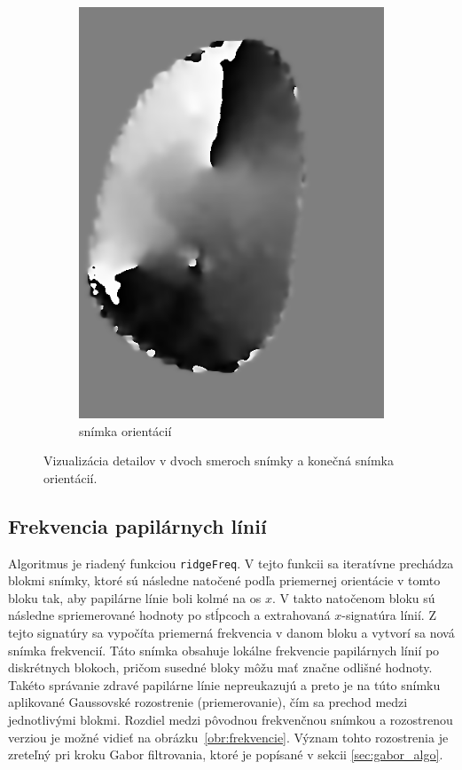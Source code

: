 \begin{figure}[h]
\begin{subfigure}[b]{0.3\linewidth}
      \includegraphics[width=\linewidth]{obrazky-figures/orientim.png}
      \caption{snímka orientácií}
    \end{subfigure}
    \caption{Vizualizácia detailov v dvoch smeroch snímky a konečná snímka orientácií.}
    \label{obr:orientacie}
  \end{figure}

  \subsection{Frekvencia papilárnych línií}
  Algoritmus je riadený funkciou \texttt{ridgeFreq}. V tejto funkcii sa iteratívne prechádza blokmi snímky, ktoré sú následne natočené podľa priemernej
  orientácie v tomto bloku tak, aby papilárne línie boli kolmé na os $x$. V takto natočenom bloku sú následne spriemerované hodnoty po stĺpcoch
  a extrahovaná $x$-signatúra línií. Z tejto signatúry sa vypočíta priemerná frekvencia v danom bloku a vytvorí sa nová snímka frekvencií. Táto snímka
  obsahuje lokálne frekvencie papilárnych línií po diskrétnych blokoch, pričom susedné bloky môžu mať značne odlišné hodnoty. Takéto správanie zdravé papilárne
  línie nepreukazujú a preto je na túto snímku aplikované Gaussovské rozostrenie (priemerovanie), čím sa  prechod medzi jednotlivými blokmi.
  Rozdiel medzi pôvodnou frekvenčnou snímkou a rozostrenou verziou je možné vidieť na obrázku~{\ref{obr:frekvencie}}. Význam tohto rozostrenia je zreteľný pri
  kroku Gabor filtrovania, ktoré je popísané v sekcii \ref{sec:gabor_algo}.

